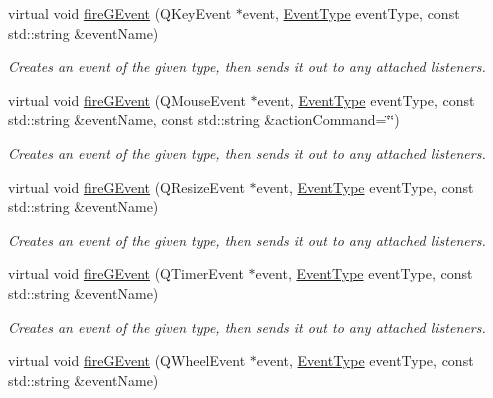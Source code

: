 \begin{DoxyCompactItemize}
virtual void \mbox{\hyperlink{classsgl_1_1GObservable_abb0b2f66ba39211cb5d7615e9d1c04e2}{fire\+G\+Event}} (Q\+Key\+Event $\ast$event, \mbox{\hyperlink{namespacesgl_a2628ea8d12e8b2563c32f05dc7fff6fa}{Event\+Type}} event\+Type, const std\+::string \&event\+Name)
\begin{DoxyCompactList}\small\item\em Creates an event of the given type, then sends it out to any attached listeners. \end{DoxyCompactList}\item 
virtual void \mbox{\hyperlink{classsgl_1_1GObservable_a119318675d2165bdf7dd853aaf881d4b}{fire\+G\+Event}} (Q\+Mouse\+Event $\ast$event, \mbox{\hyperlink{namespacesgl_a2628ea8d12e8b2563c32f05dc7fff6fa}{Event\+Type}} event\+Type, const std\+::string \&event\+Name, const std\+::string \&action\+Command=\char`\"{}\char`\"{})
\begin{DoxyCompactList}\small\item\em Creates an event of the given type, then sends it out to any attached listeners. \end{DoxyCompactList}\item 
virtual void \mbox{\hyperlink{classsgl_1_1GObservable_a63fd9034e1e1633c1c38eb342bfd34e9}{fire\+G\+Event}} (Q\+Resize\+Event $\ast$event, \mbox{\hyperlink{namespacesgl_a2628ea8d12e8b2563c32f05dc7fff6fa}{Event\+Type}} event\+Type, const std\+::string \&event\+Name)
\begin{DoxyCompactList}\small\item\em Creates an event of the given type, then sends it out to any attached listeners. \end{DoxyCompactList}\item 
virtual void \mbox{\hyperlink{classsgl_1_1GObservable_a741345310d9b7c5170a6cbc410c44ac4}{fire\+G\+Event}} (Q\+Timer\+Event $\ast$event, \mbox{\hyperlink{namespacesgl_a2628ea8d12e8b2563c32f05dc7fff6fa}{Event\+Type}} event\+Type, const std\+::string \&event\+Name)
\begin{DoxyCompactList}\small\item\em Creates an event of the given type, then sends it out to any attached listeners. \end{DoxyCompactList}\item 
virtual void \mbox{\hyperlink{classsgl_1_1GObservable_a93bf338968a0338761b8e4dc62f582e9}{fire\+G\+Event}} (Q\+Wheel\+Event $\ast$event, \mbox{\hyperlink{namespacesgl_a2628ea8d12e8b2563c32f05dc7fff6fa}{Event\+Type}} event\+Type, const std\+::string \&event\+Name)

\end{DoxyCompactItemize}
